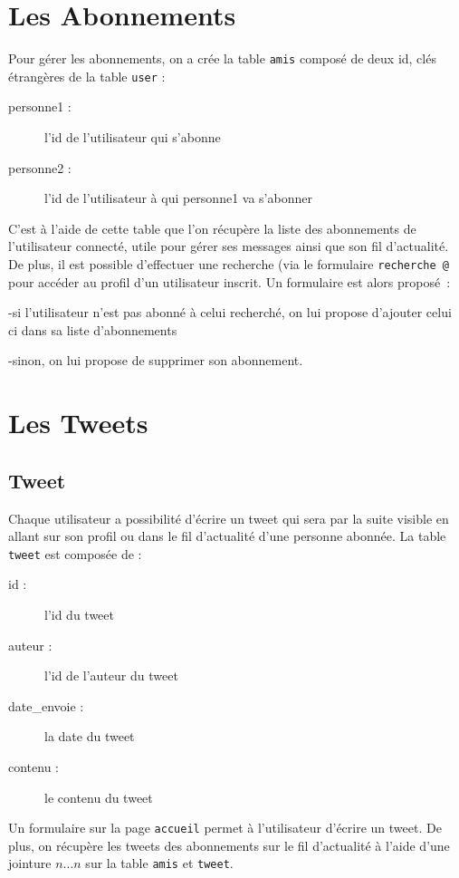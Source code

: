 \documentclass[a4paper, 12pt]{article}
\begin{document}
\section{Les Abonnements}	

Pour gérer les abonnements, on a crée la table \texttt{amis} composé de deux id, clés étrangères de la table \texttt{user} :
\begin{description}
\item[personne1 :] l’id de l’utilisateur qui s’abonne
\item[personne2 :] l’id de l’utilisateur à qui personne1 va s’abonner
\end{description}
C’est à l’aide de cette table que l’on récupère la liste des abonnements de l’utilisateur connecté, utile pour gérer ses messages ainsi que son fil d’actualité.
De plus, il est possible d’effectuer une recherche (via le formulaire \texttt{recherche @} pour accéder au profil d’un utilisateur inscrit. Un formulaire est alors proposé :
\begin{description}
\item  -si l’utilisateur n’est pas abonné à celui recherché, on lui propose d’ajouter celui ci dans sa liste d’abonnements
\item -sinon, on lui propose de supprimer son abonnement.
\end{description}

\section{Les Tweets}	

\subsection{Tweet}
Chaque utilisateur a possibilité d'écrire un tweet qui sera par la suite visible en allant sur son profil ou dans le fil d'actualité d'une personne abonnée. La table \texttt{tweet} est composée de :
\begin{description}
\item[id :] l'id du tweet
\item[auteur :] l’id de l’auteur du tweet
\item[date\_envoie :] la date du tweet
\item[contenu :] le contenu du tweet
\end{description}
Un formulaire sur la page \texttt{accueil} permet à l’utilisateur d’écrire un tweet.
De plus, on récupère les tweets des abonnements sur le fil d’actualité à l’aide d'une  jointure $n…n$ sur la table \texttt{amis} et \texttt{tweet}.
\end{document}

